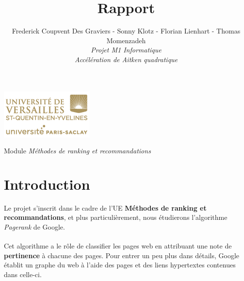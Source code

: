 
\usepackage[french,frenchkw,ruled,vlined]{../texLib/algorithm2e}

\title{\vspace{\fill}\textbf{\Huge Rapport}}
\author{
	Frederick Coupvent Des Graviers - Sonny Klotz - Florian Lienhart - Thomas Momenzadeh
	\vspace{2em}\\
	\textit{Projet M1 Informatique}\\\textit{Accélération de Aitken quadratique}
	\vspace{2em}
}



\clearpage
\maketitle\vspace{9em}
\begin{center}\includegraphics[scale=0.7]{logo.png}\end{center}
\begin{flushright}Module \textit{Méthodes de ranking et recommandations}\end{flushright}

\newpage
\tableofcontents

\newpage\clearpage{}

	\section*{Introduction}
		\paragraph{}Le projet s'inscrit dans le cadre de l'UE \textbf{Méthodes de ranking et recommandations}, et plus particulièrement, nous étudierons l'algorithme \textit{Pagerank} de Google.
		\paragraph{}Cet algorithme a le rôle de classifier les pages web en attribuant une note de \textbf{pertinence} à chacune des pages. Pour entrer un peu plus dans détails, Google établit un graphe du web à l'aide des pages et des liens hypertextes contenues dans celle-ci.
